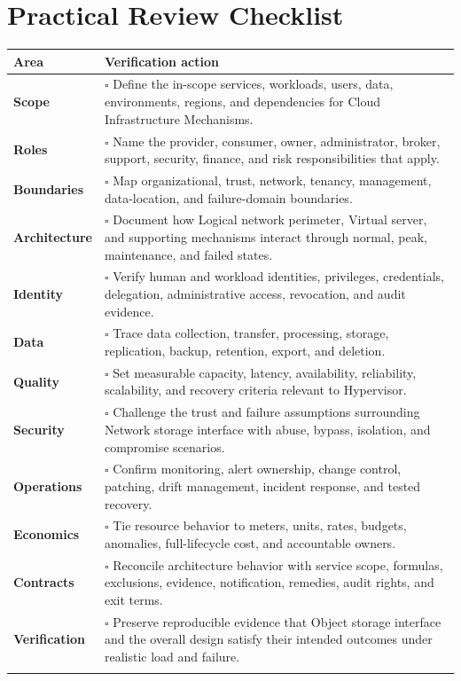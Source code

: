 \documentclass[11pt]{article}
\begin{document}
\section{Practical Review Checklist}
\begin{longtable}{@{}>{\bfseries\color{Teal}}p{}>{\RaggedRight\arraybackslash}p{}@{}}
\toprule\textbf{Area} & \textbf{Verification action}\\\midrule\endhead
Scope & $\square$ Define the in-scope services, workloads, users, data, environments, regions, and dependencies for Cloud Infrastructure Mechanisms. \\\addlinespace[2pt]
Roles & $\square$ Name the provider, consumer, owner, administrator, broker, support, security, finance, and risk responsibilities that apply. \\\addlinespace[2pt]
Boundaries & $\square$ Map organizational, trust, network, tenancy, management, data-location, and failure-domain boundaries. \\\addlinespace[2pt]
Architecture & $\square$ Document how Logical network perimeter, Virtual server, and supporting mechanisms interact through normal, peak, maintenance, and failed states. \\\addlinespace[2pt]
Identity & $\square$ Verify human and workload identities, privileges, credentials, delegation, administrative access, revocation, and audit evidence. \\\addlinespace[2pt]
Data & $\square$ Trace data collection, transfer, processing, storage, replication, backup, retention, export, and deletion. \\\addlinespace[2pt]
Quality & $\square$ Set measurable capacity, latency, availability, reliability, scalability, and recovery criteria relevant to Hypervisor. \\\addlinespace[2pt]
Security & $\square$ Challenge the trust and failure assumptions surrounding Network storage interface with abuse, bypass, isolation, and compromise scenarios. \\\addlinespace[2pt]
Operations & $\square$ Confirm monitoring, alert ownership, change control, patching, drift management, incident response, and tested recovery. \\\addlinespace[2pt]
Economics & $\square$ Tie resource behavior to meters, units, rates, budgets, anomalies, full-lifecycle cost, and accountable owners. \\\addlinespace[2pt]
Contracts & $\square$ Reconcile architecture behavior with service scope, formulas, exclusions, evidence, notification, remedies, audit rights, and exit terms. \\\addlinespace[2pt]
Verification & $\square$ Preserve reproducible evidence that Object storage interface and the overall design satisfy their intended outcomes under realistic load and failure. \\\addlinespace[2pt]
\bottomrule
\end{longtable}
\end{document}
